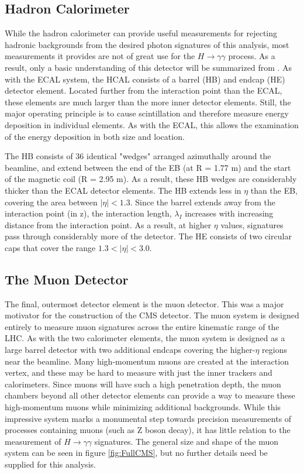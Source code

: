 \documentclass[12pt]{ucsddissertation}
\begin{document}
\subsection{Hadron Calorimeter} \label{sec:HCAL}
While the hadron calorimeter can provide useful measurements for rejecting hadronic backgrounds from the desired photon signatures of this analysis, most measurements it provides are not of great use for the $H \rightarrow \gamma \gamma$ process. As a result, only a basic understanding of this detector will be summarized from \cite{CMS2008}. As with the ECAL system, the HCAL consists of a barrel (HB) and endcap (HE) detector element. Located further from the interaction point than the ECAL, these elements are much larger than the more inner detector elements. Still, the major operating principle is to cause scintillation and therefore measure energy deposition in individual elements. As with the ECAL, this allows the examination of the energy deposition in both size and location.

The HB consists of 36 identical "wedges" arranged azimuthally around the beamline, and extend between the end of the EB (at R = 1.77 m) and the start of the magnetic coil (R = 2.95 m). As a result, these HB wedges are considerably thicker than the ECAL detector elements. The HB extends less in $\eta$ than the EB, covering the area between $|\eta| < 1.3$. Since the barrel extends away from the interaction point (in z), the interaction length, $\lambda_I$ increases with increasing distance from the interaction point. As a result, at higher $\eta$ values, signatures pass through considerably more of the detector. The HE consists of two circular caps that cover the range $1.3 < |\eta| < 3.0$. 
\subsection{The Muon Detector} \label{sec:MuonDetector}
The final, outermost detector element is the muon detector. This was a major motivator for the construction of the CMS detector. The muon system is designed entirely to measure muon signatures across the entire kinematic range of the LHC. As with the two calorimeter elements, the muon system is designed as a large barrel detector with two additional endcaps covering the higher-$\eta$ regions near the beamline. Many high-momentum muons are created at the interaction vertex, and these may be hard to measure with just the inner trackers and calorimeters. Since muons will have such a high penetration depth, the muon chambers beyond all other detector elements can provide a way to measure these high-momentum muons while minimizing additional backgrounds. While this impressive system marks a monumental step towards precision measurements of processes containing muons (such as Z boson decay), it has little relation to the measurement of $H \rightarrow \gamma \gamma$ signatures. The general size and shape of the muon system can be seen in figure \ref{fig:FullCMS}, but no further details need be supplied for this analysis.
\end{document}
